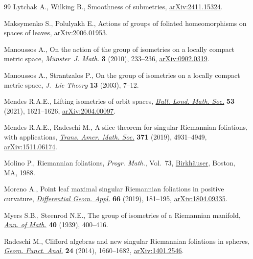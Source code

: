 \documentclass[10pt,a4paper]{amsart}
\numberwithin{equation}{section}
\theoremstyle{definition}
\begin{document}
\begin{thebibliography}{99}
Lytchak A., Wilking B., Smoothness of submetries,
 \href{http://arxiv.org/abs/2411.15324}{arXiv:2411.15324}.

Maksymenko S., Polulyakh E., Actions of groups of foliated homeomorphisms on spaces of leaves,
 \href{http://arxiv.org/abs/2006.01953}{arXiv:2006.01953}.

Manoussos A., On the action of the group of isometries on a locally compact
 metric space, \textit{M\"unster~J. Math.} \textbf{3} (2010), 233--236,
 \href{http://arxiv.org/abs/0902.0319}{arXiv:0902.0319}.

Manoussos A., Strantzalos P., On the group of isometries on a locally compact
 metric space, \textit{J.~Lie Theory} \textbf{13} (2003), 7--12.

Mendes R.A.E., Lifting isometries of orbit spaces,
 \href{https://doi.org/10.1112/blms.12514}{\textit{Bull. Lond. Math. Soc.}}
 \textbf{53} (2021), 1621--1626,
 \href{http://arxiv.org/abs/2004.00097}{arXiv:2004.00097}.

Mendes R.A.E., Radeschi M., A slice theorem for singular {R}iemannian
 foliations, with applications,
 \href{https://doi.org/10.1090/tran/7502}{\textit{Trans. Amer. Math. Soc.}}
 \textbf{371} (2019), 4931--4949,
 \href{http://arxiv.org/abs/1511.06174}{arXiv:1511.06174}.

Molino P., Riemannian foliations, \textit{Progr. Math.}, Vol.~73,
 \href{https://doi.org/10.1007/978-1-4684-8670-4}{Birkh\"auser}, Boston, MA,
 1988.

Moreno A., Point leaf maximal singular {R}iemannian foliations in positive
 curvature,
 \href{https://doi.org/10.1016/j.difgeo.2019.06.001}{\textit{Differential
 Geom. Appl.}} \textbf{66} (2019), 181--195,
 \href{http://arxiv.org/abs/1804.09335}{arXiv:1804.09335}.

Myers S.B., Steenrod N.E., The group of isometries of a {R}iemannian manifold,
 \href{https://doi.org/10.2307/1968928}{\textit{Ann. of Math.}} \textbf{40}
 (1939), 400--416.

Radeschi M., Clifford algebras and new singular {R}iemannian foliations in
 spheres, \href{https://doi.org/10.1007/s00039-014-0304-5}{\textit{Geom.
 Funct. Anal.}} \textbf{24} (2014), 1660--1682,
 \href{http://arxiv.org/abs/1401.2546}{arXiv:1401.2546}.


\end{thebibliography}
\end{document}

